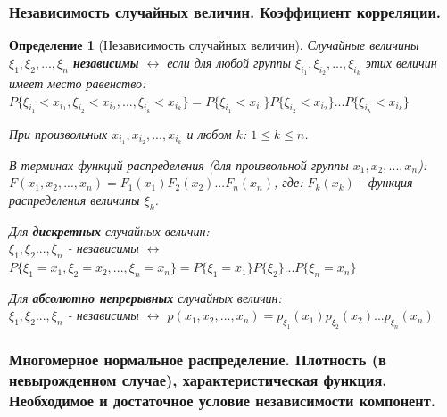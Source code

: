 \documentclass[14pt]{extarticle}
\theoremstyle{breakstyle}
\newtheorem{definition}{Определение}[subsection]
\begin{document}
\subsubsection{Независимость случайных величин. Коэффициент корреляции.}
\begin{definition}[Независимость случайных величин]

Случайные величины $\xi_{1}, \xi_{2}, ..., \xi_{n}$ \textbf{независимы} $\leftrightarrow$ если для любой группы $\xi_{i_{1}}, \xi_{i_{2}}, ..., \xi_{i_{k}}$ этих величин имеет место равенство:\\
$P\{\xi_{i_{1}} < x_{i_{1}}, \xi_{i_{2}} < x_{i_{2}}, ..., \xi_{i_{k}} < x_{i_{k}}\} = P\{\xi_{i_{1}} < x_{i_{1}}\}P\{\xi_{i_{2}} < x_{i_{2}}\}...P\{\xi_{i_{k}} < x_{i_{k}}\}$

\vspace{\baselineskip}

При произвольных $x_{i_{1}}, x_{i_{2}}, ..., x_{i_{k}}$ и любом $k$: $1 \leq k \leq n$.

\vspace{\baselineskip}

В терминах функций распределения (для произвольной группы $x_{1}, x_{2}, ..., x_{n}$):\\
$F(x_{1}, x_{2}, ..., x_{n}) = F_{1}(x_{1})F_{2}(x_{2})...F_{n}(x_{n})$, где: $F_{k}(x_{k})$ - функция распределения величины $\xi_{k}$.

\vspace{\baselineskip}

Для \textbf{дискретных} случайных величин:\\
$\xi_{1}, \xi_{2} ..., \xi_{n}$ - независимы $\leftrightarrow$ $P\{\xi_{1} = x_{1}, \xi_{2} = x_{2}, ..., \xi_{n} = x_{n}\} = P\{\xi_{1} = x_{1}\}P\{\xi_{2}\}...P\{\xi_{n} = x_{n}\}$

\vspace{\baselineskip}

Для \textbf{абсолютно непрерывных} случайных величин:\\
$\xi_{1}, \xi_{2} ..., \xi_{n}$ - независимы $\leftrightarrow$ $p(x_{1}, x_{2}, ..., x_{n}) = p_{\xi_{1}}(x_{1})p_{\xi_{2}}(x_{2})...p_{\xi_{n}}(x_{n})$

\end{definition}

\subsubsection{Многомерное нормальное распределение. Плотность (в невырожденном случае), характеристическая функция. Необходимое и достаточное условие независимости компонент.}
\end{document}
